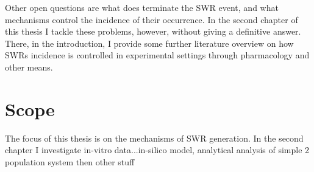 
    Other open questions are what does terminate the SWR event, and what
    mechanisms control the incidence of their occurrence. In the second chapter
    of this thesis I tackle these problems, however, without giving a
    definitive answer. There, in the introduction, I provide some further
    literature overview on how SWRs incidence is controlled in experimental
    settings through pharmacology and other means.


\section{Scope}
  The focus of this thesis is on the mechanisms of SWR generation. In the second chapter I
  investigate in-vitro data...in-silico model, analytical analysis of simple 2 population system
  then other stuff


